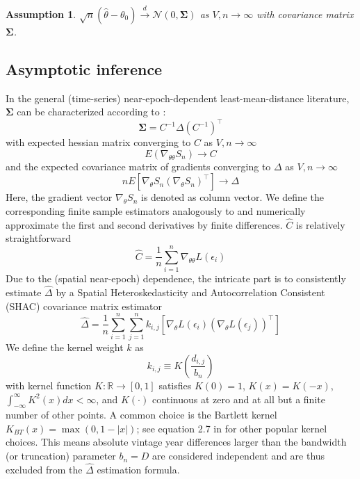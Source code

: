 \documentclass[12pt]{article}
\newtheorem{assume}{Assumption}
\begin{document}
\begin{assume}
	$\sqrt{n}(\hat{\theta} - \theta_0) \overset{d}{\to} \mathcal{N}(0,\mathbf{\Sigma})$ as $V,n \to \infty$ with covariance matrix $\mathbf{\Sigma}$.
\end{assume}

\subsection{Asymptotic inference}
\label{sec:asymptotic_inference}

In the general (time-series) near-epoch-dependent least-mean-distance literature, $\mathbf{\Sigma}$ can be characterized according to \citet[Theorem 11.2.b, Theorem H.1]{PP97}:
\[
\mathbf{\Sigma} = C^{-1} \Delta (C^{-1})^\top
\]
with expected hessian matrix converging to $C$ as $V,n \to \infty$
\[
E 
\left(
\nabla_{\theta \theta} S_n
\right)
\to C
\]
and the expected covariance matrix of gradients converging to $\Delta$ as $V,n \to \infty$
\[
n E 
\left[
\nabla_{\theta} S_n
(\nabla_{\theta} S_n)^\top
\right]
\to \Delta
\]
Here, the gradient vector $\nabla_{\theta} S_n$ is denoted as column vector.
We define the corresponding finite sample estimators analogously to \citet[Chapters 12, 13.1]{PP97} and numerically approximate the first and second derivatives by finite differences. $\hat{C}$ is relatively straightforward
\[
\hat{C} = \frac{1}{n} \sum_{i=1}^n \nabla_{\theta \theta} L \left( \epsilon_i \right)
\]
Due to the (spatial near-epoch) dependence, the intricate part is to consistently estimate $\hat{\Delta}$ by a Spatial Heteroskedasticity and Autocorrelation Consistent (SHAC) covariance matrix estimator \cite[equation 2]{KS11}
\begin{equation}
\label{eq:hac}
\hat{\Delta} = \frac{1}{n} \sum_{i=1}^n \sum_{j=1}^n
k_{i,j}
\left[
\nabla_{\theta} L \left( \epsilon_i \right)
\left(
\nabla_{\theta} L \left( \epsilon_j \right)
\right)^\top
\right]
\end{equation}
We define the kernel weight $k$ as
\[
k_{i,j} \equiv K \left( \frac{d_{i,j}}{b_n} \right)
\]
with kernel function $K: \mathbb{R} \to [0,1]$ satisfies $K(0)=1$, $K(x)=K(-x)$, $\int_{-\infty}^{\infty} K^2(x) dx < \infty$, and $K(\cdot)$ continuous at zero and at all but a finite number of other points.
A common choice is the Bartlett kernel $K_{BT}(x)= \max(0, 1-|x|)$; see equation 2.7 in \cite{A91} for other popular kernel choices.
This means absolute vintage year differences larger than the bandwidth (or truncation) parameter $b_n=D$ are considered independent and are thus excluded from the $\hat{\Delta}$ estimation formula.
\end{document}
